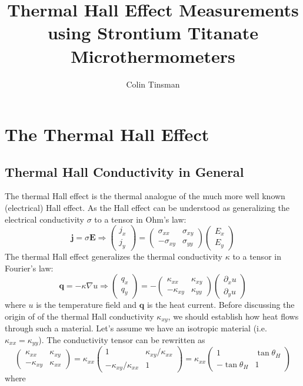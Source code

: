 \documentclass{thesis-umich}
\author{Colin Tinsman}
\title{Thermal Hall Effect Measurements using Strontium Titanate Microthermometers}
\begin{document}
\doublespacing

\chapter{The Thermal Hall Effect}


\section{Thermal Hall Conductivity in General}

The thermal Hall effect is the thermal analogue of the much more well known
(electrical) Hall effect. As the Hall effect can be understood as generalizing
the electrical conductivity \(\sigma\) to a tensor in Ohm's law: \[\mathbf{j} =
	\sigma \mathbf{E} \Rightarrow \begin{pmatrix} j_x \\ j_y \end{pmatrix}
= \begin{pmatrix} \sigma_{xx} & \sigma_{xy} \\ -\sigma_{xy} & \sigma_{yy}
\end{pmatrix} \begin{pmatrix} E_x \\ E_y \end{pmatrix} \] The thermal Hall
effect generalizes the thermal conductivity \(\kappa\) to a tensor in Fourier's
law: \[\mathbf{q} = -\kappa \nabla u \Rightarrow \begin{pmatrix} q_x \\ q_y
	\end{pmatrix} = -\begin{pmatrix} \kappa_{xx} & \kappa_{xy} \\
		-\kappa_{xy} & \kappa_{yy} \end{pmatrix} \begin{pmatrix}
		\partial_x u \\ \partial_y u \end{pmatrix} \] where \(u\) is
	the temperature field and \(\mathbf{q}\) is the heat current. Before
	discussing the origin of of the thermal Hall conductivity
	\(\kappa_{xy}\), we should establish how heat flows through such a
	material. Let's assume we have an isotropic material (i.e.
	\(\kappa_{xx} = \kappa_{yy}\)). The conductivity tensor can be
	rewritten as \[\begin{pmatrix} \kappa_{xx} & \kappa_{xy} \\
			-\kappa_{xy} & \kappa_{xx} \end{pmatrix} = \kappa_{xx}
		\begin{pmatrix} 1 & \kappa_{xy}/\kappa_{xx} \\
		-\kappa_{xy}/\kappa_{xx} & 1 \end{pmatrix} = \kappa_{xx}
\begin{pmatrix} 1 & \tan \theta_H \\ -\tan \theta_H & 1 \end{pmatrix} \] where
\end{document}
